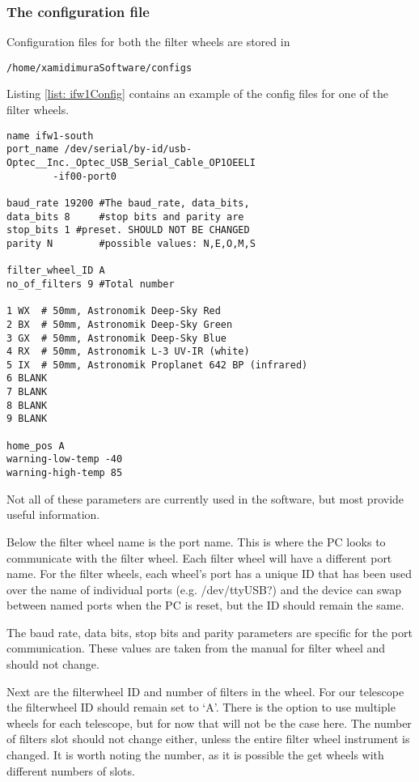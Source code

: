 \documentclass[a4paper,12pt]{article}
\begin{document}
\subsubsection{The configuration file}
\label{subsubsec:IFWconfig}

Configuration files for both the filter wheels are stored in 
\begin{verbatim}
/home/xamidimuraSoftware/configs
\end{verbatim}
Listing \ref{list: ifw1Config} contains an example of the config files for one of the filter wheels.
\begin{lstlisting}[caption={Example configuration file for South filter wheel}, label={list: ifw1Config}]
name ifw1-south
port_name /dev/serial/by-id/usb-Optec__Inc._Optec_USB_Serial_Cable_OP1OEELI
		-if00-port0

baud_rate 19200 #The baud_rate, data_bits,
data_bits 8     #stop bits and parity are
stop_bits 1 #preset. SHOULD NOT BE CHANGED
parity N        #possible values: N,E,O,M,S

filter_wheel_ID A
no_of_filters 9 #Total number

1 WX  # 50mm, Astronomik Deep-Sky Red
2 BX  # 50mm, Astronomik Deep-Sky Green
3 GX  # 50mm, Astronomik Deep-Sky Blue
4 RX  # 50mm, Astronomik L-3 UV-IR (white)
5 IX  # 50mm, Astronomik Proplanet 642 BP (infrared)
6 BLANK
7 BLANK
8 BLANK
9 BLANK

home_pos A
warning-low-temp -40
warning-high-temp 85
\end{lstlisting}

Not all of these parameters are currently used in the software, but most provide useful information. 

Below the filter wheel name is the port name. This is where the PC looks to communicate with the filter wheel. Each filter wheel will have a different port name. For the filter wheels, each wheel's port has a unique ID that has been used over the name of individual ports (e.g. /dev/ttyUSB?) and the device can swap between named ports when the PC is reset, but the ID should remain the same.

The baud rate, data bits, stop bits and parity parameters are specific for the port communication. These values are taken from the manual for filter wheel and should not change.

Next are the filterwheel ID and number of filters in the wheel. For our telescope the filterwheel ID should remain set to `A'. There is the option to use multiple wheels for each telescope, but for now that will not be the case here. The number of filters slot should not change either, unless the entire filter wheel instrument is changed. It is worth noting the number, as it is possible the get wheels with different numbers of slots.
\end{document}
